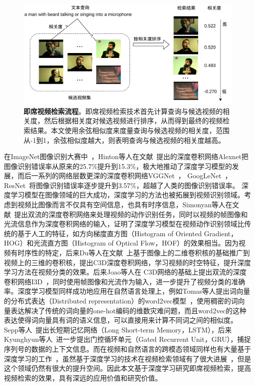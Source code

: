 \begin{figure}[tbh!]
    \centering
    \includegraphics[width=\linewidth]{figures/1}
    \caption[即席视频检索流程]{\textbf{即席视频检索流程}。即席视频检索技术首先计算查询与候选视频的相关度，然后根据相关度对候选视频进行排序，从而得到最终的视频检索结果。本文使用余弦相似度来度量查询与候选视频的相关度，范围从-1到1，余弦相似度越大，则表明查询与候选视频的相关度越高。}
    \label{fig:fig_1}
\end{figure}

在ImageNet图像识别大赛中~\cite{deng2009imagenet}，Hinton等人在文献~\cite{krizhevsky2012imagenet}提出的深度卷积网络Alexnet把图像识别错误率从原来的25.7\%提升到15.3\%，极大地推动了深度学习模型的发展，而后一系列的网络层数更深的深度卷积网络VGGNet~\cite{simonyan2014very}，
GoogLeNet~\cite{szegedy2015going}，ResNet~\cite{he2016deep}将图像识别错误率逐步提升到3.57\%，超越了人类的图像识别错误率。
深度学习模型在图像领域的巨大成功，深度学习的方法也被拓展到视频识别领域。考虑到视频比图像而言不仅具有空间信息，也具有时序信息，Simonyan等人在文献~\cite{simonyan2014two}提出双流的深度卷积网络来处理视频的动作识别任务，同时以视频的帧图像和光流信息作为深度卷积网络的输入，证明了深度学习模型在视频动作识别领域比传统的基于人工的特征，如方向梯度直方图（Histogram of Oriented Gradient，HOG）和光流直方图（Histogram of Optical Flow，HOF）的效果相当。因为视频有时序性的特定，后来Du等人在文献~\cite{tran2015learning}上基于图像上的二维卷积核的基础推广到视频上的三维的卷积核，提出C3D深度卷积网络，学习视频的时空特征，提升深度学习方法在视频分类的效果。后来Joao等人在
C3D网络的基础上提出双流的深度卷积网络I3D~\cite{carreira2017quo}，同时使用帧图像和光流作为输入，进一步提升了视频分类的准确率。深度学习模型同样成功地应用在自然语言处理上，例如Tomas等人提出词向量的分布式表达（Distributed representation）的word2vec模型~\cite{mikolov2013distributed}，使用稠密的词向量表达解决了传统的词向量的one-hot编码的维数灾难问题，而且word2vec的这种表达使得词向量具有词的语义信息，可以直接用来计算不同词之间的相似度。Sepp等人~\cite{hochreiter1997long}提出长短期记忆网络（Long Short-term Memory，LSTM），后来Kyunghyun等人~\cite{cho2014learning}进一步提出门控循环单元（Gated Recurrent Unit，GRU），捕捉序列号的数据的上下文信息。而在视频和自然语言的跨模态领域同样也有大量基于深度学习的工作~\cite{venugopalan2015sequence,yao2015describing,otani2016learning,dong2018predicting,sun2019videobert,miech2019howto100m}，虽然基于深度学习的技术在视频检索领域有了很大进展~\cite{mithun2018learning,miech2018learning,dong2019dual,liu2019use}，但是这个领域仍然有很大的提升空间。因此本文基于深度学习研究即席视频检索，提高视频检索的效果，具有深远的应用价值和研究价值。


